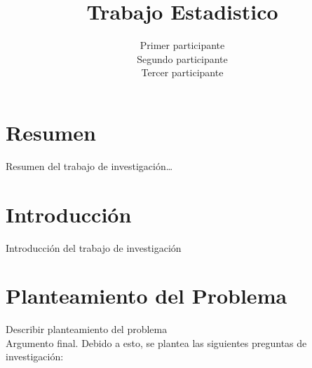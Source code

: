 \documentclass[oneside,11pt]{Latex/Classes/PhDthesisPSnPDF}
\title{Trabajo Estadistico}
\author{Primer participante \\ Segundo participante \\ Tercer
participante}
\begin{document}
\maketitle

\frontmatter


\setcounter{secnumdepth}{3}
\setcounter{tocdepth}{3}

\tableofcontents



\cleardoublepage

  \cleardoublepage       %
  \chapter*{Resumen}     %
  
  Resumen del trabajo de
investigación\ldots{}             %
  
  \cleardoublepage

\mainmatter
\def\baselinestretch{1.5}

\chapter*{Introducción}

Introducción del trabajo de investigación

\chapter{Planteamiento del Problema}

Describir planteamiento del problema\\

Argumento final. Debido a esto, se plantea las siguientes preguntas de
investigación:\\
\end{document}
